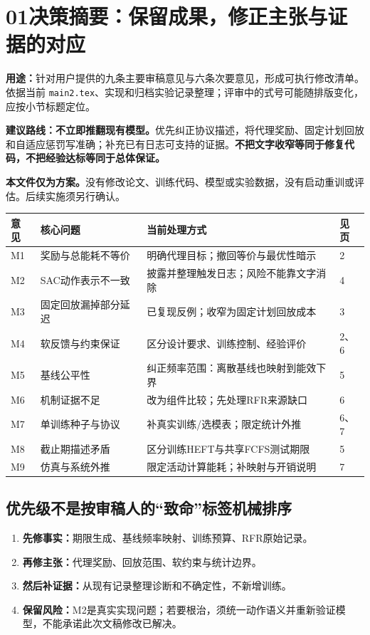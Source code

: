 \documentclass[UTF8,11pt,a4paper,fontset=fandol]{ctexart}
\newcommand{\partpage}[2]{\section*{#1\quad #2}}
\newcommand{\code}[1]{\nolinkurl{#1}}
\begin{document}
\partpage{01}{决策摘要：保留成果，修正主张与证据的对应}
\textbf{用途：}针对用户提供的九条主要审稿意见与六条次要意见，形成可执行修改清单。依据当前 \code{main2.tex}、实现和归档实验记录整理；评审中的式号可能随排版变化，应按小节标题定位。

\begin{decision}
\textbf{建议路线：不立即推翻现有模型。}优先纠正协议描述，将代理奖励、固定计划回放和自适应惩罚写准确；补充已有日志可支持的证据。\textbf{不把文字收窄等同于修复代码，不把经验达标等同于总体保证。}
\end{decision}

\textbf{本文件仅为方案。}没有修改论文、训练代码、模型或实验数据，没有启动重训或评估。后续实施须另行确认。

\renewcommand{\arraystretch}{1.17}
\begin{tabularx}{\linewidth}{@{}p{9mm}p{33mm}Xp{18mm}@{}}
\toprule
意见 & 核心问题 & 当前处理方式 & 见页\\\midrule
M1 & 奖励与总能耗不等价 & 明确代理目标；撤回等价与最优性暗示 & 2\\
M2 & SAC动作表示不一致 & 披露并整理触发日志；风险不能靠文字消除 & 4\\
M3 & 固定回放漏掉部分延迟 & 已复现反例；收窄为固定计划回放成本 & 3\\
M4 & 软反馈与约束保证 & 区分设计要求、训练控制、经验评价 & 2、6\\
M5 & 基线公平性 & 纠正频率范围：离散基线也映射到能效下界 & 5\\
M6 & 机制证据不足 & 改为组件比较；先处理RFR来源缺口 & 6\\
M7 & 单训练种子与协议 & 补真实训练/选模表；限定统计外推 & 6、7\\
M8 & 截止期描述矛盾 & 区分训练HEFT与共享FCFS测试期限 & 5\\
M9 & 仿真与系统外推 & 限定活动计算能耗；补映射与开销说明 & 7\\\bottomrule
\end{tabularx}

\subsection*{优先级不是按审稿人的“致命”标签机械排序}
\begin{enumerate}
\item \textbf{先修事实：}期限生成、基线频率映射、训练预算、RFR原始记录。
\item \textbf{再修主张：}代理奖励、回放范围、软约束与统计边界。
\item \textbf{然后补证据：}从现有记录整理诊断和不确定性，不新增训练。
\item \textbf{保留风险：}M2是真实实现问题；若要根治，须统一动作语义并重新验证模型，不能承诺此次文稿修改已解决。
\end{enumerate}
\end{document}
